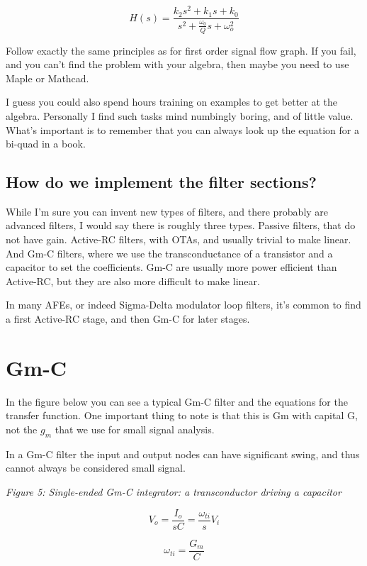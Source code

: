 \[ H(s) = \frac{k_2 s^2 + k_1 s + k_0}{s^2 + \frac{\omega_0}{Q} s +
 \omega_o^2}\]

Follow exactly the same principles as for first order signal flow graph.
If you fail, and you can't find the problem with your algebra, then
maybe you need to use Maple or Mathcad.

I guess you could also spend hours training on examples to get better at
the algebra. Personally I find such tasks mind numbingly boring, and of
little value. What's important is to remember that you can always look
up the equation for a bi-quad in a book.

\subsection{How do we implement the filter
sections?}\label{how-do-we-implement-the-filter-sections}

While I'm sure you can invent new types of filters, and there probably
are advanced filters, I would say there is roughly three types. Passive
filters, that do not have gain. Active-RC filters, with OTAs, and
usually trivial to make linear. And Gm-C filters, where we use the
transconductance of a transistor and a capacitor to set the
coefficients. Gm-C are usually more power efficient than Active-RC, but
they are also more difficult to make linear.

In many AFEs, or indeed Sigma-Delta modulator loop filters, it's common
to find a first Active-RC stage, and then Gm-C for later stages.

\section{Gm-C}\label{gm-c}

In the figure below you can see a typical Gm-C filter and the equations
for the transfer function. One important thing to note is that this is
Gm with capital G, not the \(g_m\) that we use for small signal
analysis.

In a Gm-C filter the input and output nodes can have significant swing,
and thus cannot always be considered small signal.


{
\centering
{}
}

\emph{Figure 5: Single-ended Gm-C integrator: a transconductor driving a
capacitor}

\[ V_o = \frac{I_o}{s C} = \frac{\omega_{ti}}{s} V_i \]

\[ \omega_{ti} = \frac{G_m}{C}\]

